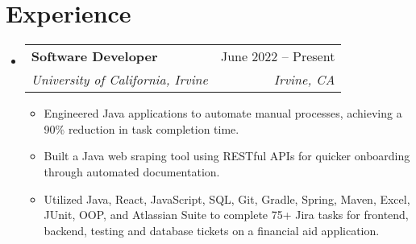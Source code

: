 \documentclass[letterpaper,11pt]{article}
\makeatletter
\newcommand{\resumeItem}[1]{
  \item\small{
    {#1 \vspace{-2pt}}
  }
}
\newcommand{\resumeSubheading}[4]{
  \vspace{-2pt}\item
    \begin{tabular*}{0.97\textwidth}[t]{l@{\extracolsep{\fill}}r}
      \textbf{#1} & #2 \\
      \textit{\small#3} & \textit{\small #4} \\
    \end{tabular*}\vspace{-7pt}
}
\newcommand{\resumeSubSubheading}[2]{
    \item
    \begin{tabular*}{0.97\textwidth}{l@{\extracolsep{\fill}}r}
      \textit{\small#1} & \textit{\small #2} \\
    \end{tabular*}\vspace{-7pt}
}
\newcommand{\resumeSubHeadingListStart}{\begin{itemize}[leftmargin=0.15in, label={}]}
\newcommand{\resumeSubHeadingListEnd}{\end{itemize}}
\newcommand{\resumeItemListStart}{\begin{itemize}}
\newcommand{\resumeItemListEnd}{\end{itemize}\vspace{-5pt}}
\makeatother
\begin{document}
\section{Experience}
  \resumeSubHeadingListStart

    \resumeSubheading
      {Software Developer}{June 2022 -- Present}
      {University of California, Irvine}{Irvine, CA}
      \resumeItemListStart
        \resumeItem{Engineered Java applications to automate manual processes, achieving a 90\% reduction in task completion time.}
        \resumeItem{Built a Java web sraping tool using RESTful APIs for quicker onboarding through automated documentation.
        }
        \resumeItem{Utilized Java, React, JavaScript, SQL, Git, Gradle, Spring, Maven, Excel, JUnit, OOP, and Atlassian Suite to complete 75+ Jira tasks for frontend, backend, testing and database tickets on a financial aid application. 
        }
      \resumeItemListEnd
      

  \resumeSubHeadingListEnd


\end{document}

